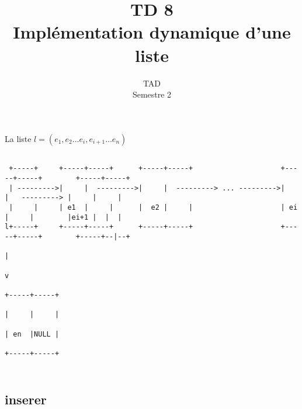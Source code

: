 \documentclass{article}
\title{TD 8\\ Implémentation dynamique d'une liste}
\date{TAD\\ Semestre 2}
\begin{document}
	\maketitle
	\section{}
		La liste $ l = (e_{1}, e_{2} \dots e_{i}, e_{i+1} \dots e_{n})$
		\begin{verbatim}
   
 +-----+     +-----+-----+      +-----+-----+                     +-----+-----+        +-----+-----+       
 | --------->|     |  --------->|     |  ---------> ... --------->|     |   ---------> |     |     |
 |     |     | e1  |     |      |  e2 |     |                     | ei  |     |        |ei+1 |  |  |
l+-----+     +-----+-----+      +-----+-----+                     +-----+-----+        +-----+--|--+              
                                                                                                |
                                                                                                v
                                                                                             +-----+-----+       
                                                                                             |     |     |
                                                                                             | en  |NULL |
                                                                                             +-----+-----+
 

		\end{verbatim}

	\section{}
		
		
		
	\subsection{inserer}
\end{document}
